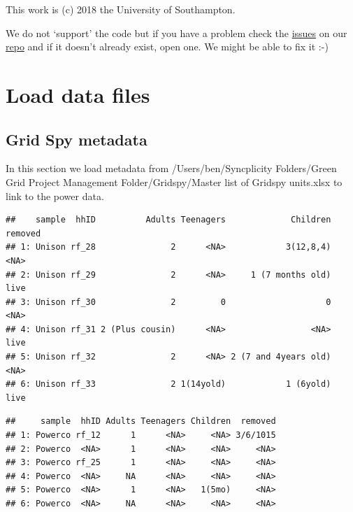 \documentclass[]{article}
\begin{document}
This work is (c) 2018 the University of Southampton.

We do not `support' the code but if you have a problem check the
\href{https://git.soton.ac.uk/ba1e12/nzGREENGrid/issues}{issues} on our
\href{https://git.soton.ac.uk/ba1e12/nzGREENGrid}{repo} and if it
doesn't already exist, open one. We might be able to fix it :-)

\section{Load data files}\label{load-data-files}

\subsection{Grid Spy metadata}\label{grid-spy-metadata}

In this section we load metadata from /Users/ben/Syncplicity
Folders/Green Grid Project Management Folder/Gridspy/Master list of
Gridspy units.xlsx to link to the power data.

\begin{verbatim}
##    sample  hhID          Adults Teenagers             Children removed
## 1: Unison rf_28               2      <NA>            3(12,8,4)    <NA>
## 2: Unison rf_29               2      <NA>     1 (7 months old)    live
## 3: Unison rf_30               2         0                    0    <NA>
## 4: Unison rf_31 2 (Plus cousin)      <NA>                 <NA>    live
## 5: Unison rf_32               2      <NA> 2 (7 and 4years old)    <NA>
## 6: Unison rf_33               2 1(14yold)            1 (6yold)    live
\end{verbatim}

\begin{verbatim}
##     sample  hhID Adults Teenagers Children  removed
## 1: Powerco rf_12      1      <NA>     <NA> 3/6/1015
## 2: Powerco  <NA>      1      <NA>     <NA>     <NA>
## 3: Powerco rf_25      1      <NA>     <NA>     <NA>
## 4: Powerco  <NA>     NA      <NA>     <NA>     <NA>
## 5: Powerco  <NA>      1      <NA>   1(5mo)     <NA>
## 6: Powerco  <NA>     NA      <NA>     <NA>     <NA>
\end{verbatim}
\end{document}
